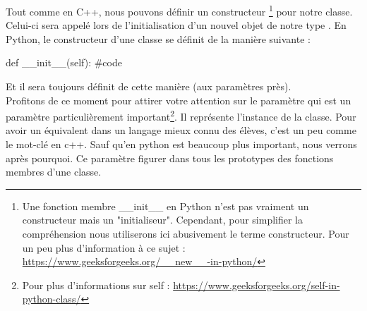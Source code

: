 Tout comme en C++, nous pouvons définir un constructeur
\footnote{Une fonction membre \_\_init\_\_ en Python n'est pas vraiment un constructeur mais un "initialiseur". Cependant, pour simplifier la compréhension nous utiliserons ici abusivement le terme constructeur. Pour un peu plus d'information à ce sujet : \url{https://www.geeksforgeeks.org/__new__-in-python/}}
pour notre classe. Celui-ci sera appelé lors de l'initialisation d'un nouvel objet de notre type .\newline
En Python, le constructeur d'une classe se définit de la manière suivante :
\begin{Python}
def __init__(self):
    #code
\end{Python}
Et il sera toujours définit de cette manière (aux paramètres près).\\

Profitons de ce moment pour attirer votre attention sur le paramètre  qui est un paramètre particulièrement important\footnote{Pour plus d'informations sur self : \url{https://www.geeksforgeeks.org/self-in-python-class/}}. Il représente l'instance de la classe. Pour avoir un équivalent dans un langage mieux connu des élèves, c'est un peu comme le mot-clé  en c++. Sauf qu'en python  est beaucoup plus important, nous verrons après pourquoi.\newline
Ce paramètre  figurer dans tous les prototypes des fonctions membres d'une classe.\\


